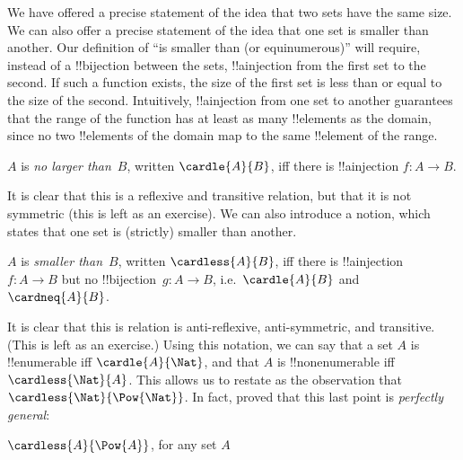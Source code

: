 \documentclass[../../../include/open-logic-section]{subfiles}
\begin{document}


\begin{explain}
	We have offered a precise statement of the idea that two sets have the same
size. We can
also offer a precise statement of the idea that one set is smaller than another. 
Our definition of
``is smaller than (or equinumerous)'' will require, instead of a
!!{bijection} between the sets, !!a{injection} from the first
set to the second. If such a function exists, the size of the first
set is less than or equal to the size of the second. Intuitively,
!!a{injection} from one set to another guarantees that the range of
the function has at least as many !!{element}s as the domain, since no two
!!{element}s of the domain map to the same !!{element} of the range.
\end{explain}
\begin{defn}
$A$ is \emph{no larger than}~$B$, written $\cardle{A}{B}$, iff there
  is !!a{injection} $f \colon A \to B$.
\end{defn}\noindent
It is clear that this is a reflexive and transitive relation, but that it is not symmetric (this is left as an exercise). We can also introduce a notion, which states that one set is (strictly) smaller than another. 
\begin{defn}
$A$ is \emph{smaller than}~$B$, written $\cardless{A}{B}$, iff
  there is !!a{injection}~$f\colon A \to B$ but no
  !!{bijection}~$g\colon A \to B$, i.e.\ $\cardle{A}{B}$ and $\cardneq{A}{B}$.
\end{defn}\noindent
It is clear that this is relation is anti-reflexive, anti-symmetric, and transitive. (This is left as an exercise.) Using this notation, we can say that a set $A$ is !!{enumerable} iff $\cardle{A}{\Nat}$, and that $A$ is !!{nonenumerable} iff $\cardless{\Nat}{A}$. This allows us to restate  as the observation that $\cardless{\Nat}{\Pow{\Nat}}$. In fact, \citet{Cantor1892} proved that this last point is \emph{perfectly general}:
\begin{thm}[Cantor]
$\cardless{A}{\Pow{A}}$, for any set $A$
\end{thm}
\end{document}
